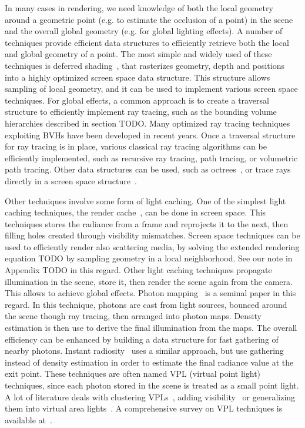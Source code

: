 In many cases in rendering, we need knowledge of both the local geometry around a geometric point (e.g. to estimate the occlusion of a point) in the scene and the overall global geometry (e.g. for global lighting effects). A number of techniques provide efficient data structures to efficiently retrieve both the local and global geometry of a point. The most simple and widely used of these techniques is deferred shading~\cite{Saito1990}, that rasterizes geometry, depth and positions into a highly optimized screen space data structure. This structure allows sampling of local geometry, and it can be used to implement various screen space techniques. For global effects, a common approach is to create a traversal structure to efficiently implement ray tracing, such as the bounding volume hierarchies described in section TODO. Many optimized ray tracing techniques exploiting BVHs have been developed in recent years. Once a traversal structure for ray tracing is in place, various classical ray tracing algorithms can be efficiently implemented, such as recursive ray tracing, path tracing, or volumetric path tracing. Other data structures can be used, such as octrees~\cite{Havran2000}, or trace rays directly in a screen space structure~\cite{Tanaka1986,Widmer2015}.

Other techniques involve some form of light caching. One of the simplest light caching techniques, the render cache~\cite{Walter2002}, can be done in screen space. This techniques stores the radiance from a frame and reprojects it to the next, then filling holes created through visibility mismatches. Screen space techniques can be used to efficiently render also scattering media, by solving the extended rendering equation TODO by sampling geometry in a local neighborhood. See our note in Appendix TODO in this regard. Other light caching techniques propagate illumination in the scene, store it, then render the scene again from the camera. This allows to achieve global effects. Photon mapping~\cite{Jensen1996} is a seminal paper in this regard. In this technique, photons are cast from light sources, bounced around the scene though ray tracing, then arranged into photon maps. Density estimation is then use to derive the final illumination from the maps. The overall efficiency can be enhanced by building a data structure for fast gathering of nearby photons. Instant radiosity~\cite{Keller1997} uses a similar approach, but use gathering instead of density estimation in order to estimate the final radiance value at the exit point. These techniques are often named VPL (virtual point light) techniques, since each photon stored in the scene is treated as a small point light. A lot of literature deals with clustering VPLs~\cite{Walter2005}, adding visibility~\cite{Ritschel2008} or generalizing them into virtual area lights~\cite{Dong09}. A comprehensive survey on VPL techniques is available at~\cite{Dachsbacher2014}.

